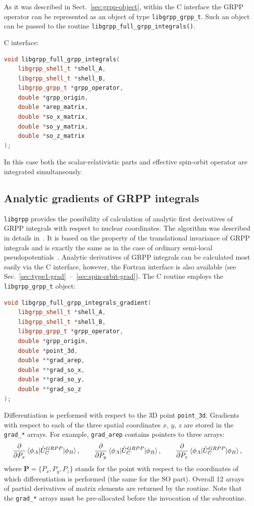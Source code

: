 \documentclass[12pt]{article}
\begin{document}
As it was described in Sect.~\ref{sec:grpp-object}, within the C interface the GRPP operator can be represented as an object of type \texttt{libgrpp\_grpp\_t}. Such an object can be passed to the routine \texttt{libgrpp\_full\_grpp\_integrals()}.

C interface:
\begin{lstlisting}[language=C++]
void libgrpp_full_grpp_integrals(
    libgrpp_shell_t *shell_A,
    libgrpp_shell_t *shell_B,
    libgrpp_grpp_t *grpp_operator,
    double *grpp_origin,
    double *arep_matrix,
    double *so_x_matrix,
    double *so_y_matrix,
    double *so_z_matrix
);
\end{lstlisting}
%
In this case both the scalar-relativistic parts and effective spin-orbit operator are integrated simultaneously.


\subsection{Analytic gradients of GRPP integrals}

\texttt{libgrpp} provides the possibility of calculation of analytic first derivatives of GRPP integrals with respect to nuclear coordinates. The algorithm was described in details in~\cite{Oleynichenko:LIBGRPP:23}. It is based on the property of the translational invariance of GRPP integrals and is exactly the same as in the case of ordinary semi-local pseudopotentials~\cite{Breidung:88,Russo:95,Cui:96,Bode:99,Song:15}. Analytic derivatives of GRPP integrals can be calculated most easily via the C interface, however, the Fortran interface is also available (see Sec.~\ref{sec:type1-grad}~--~\ref{sec:spin-orbit-grad}). The C routine employs the \texttt{libgrpp\_grpp\_t} object:
\begin{lstlisting}[language=C++]
void libgrpp_full_grpp_integrals_gradient(
    libgrpp_shell_t *shell_A,
    libgrpp_shell_t *shell_B,
    libgrpp_grpp_t *grpp_operator,
    double *grpp_origin,
    double *point_3d,
    double **grad_arep,
    double **grad_so_x,
    double **grad_so_y,
    double **grad_so_z
);
\end{lstlisting}
Differentiation is performed with respect to the 3D point \texttt{point\_3d}. Gradients with respect to each of the three spatial coordinates $x$, $y$, $z$ are stored in the \texttt{grad\_*} arrays. For example, \texttt{grad\_arep} contains pointers to three arrays:
\begin{equation}
\frac{\partial}{\partial P_x} \braket{\phi_A|\hat{U}^{GRPP}_C|\phi_B},\quad\quad
\frac{\partial}{\partial P_y} \braket{\phi_A|\hat{U}^{GRPP}_C|\phi_B},\quad\quad
\frac{\partial}{\partial P_z} \braket{\phi_A|\hat{U}^{GRPP}_C|\phi_B},
\end{equation}
where $\bm{P} = \{ P_x, P_y, P_z \}$ stands for the point with respect to the coordinates of which differentiation is performed (the same for the SO part). Overall 12 arrays of partial derivatives of matrix elements are returned
by the routine. Note that the \texttt{grad\_*} arrays must be pre-allocated before the invocation of the subroutine.
\end{document}
